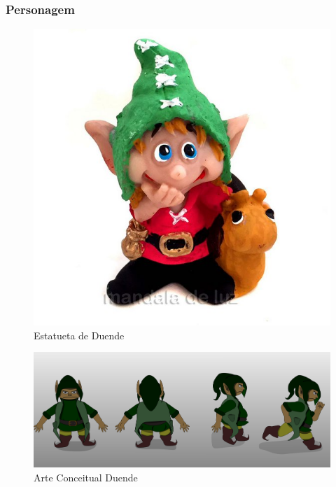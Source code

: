 \subsubsection{Personagem}

\begin{figure}[htb]
	\caption{\label{duendeRef}Estatueta de Duende}
	\begin{center}
	    \includegraphics[width=\textwidth/2]{imagens/duendeRef.jpg}
	\end{center}
\end{figure}



\begin{figure}[htb]
	\caption{\label{duendePos}Arte Conceitual Duende}
	\begin{center}
	    \includegraphics[width=\textwidth]{imagens/duendePosicoes.jpeg}
	\end{center}
\end{figure}

